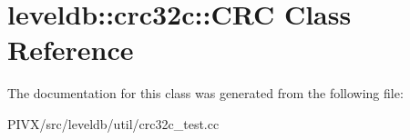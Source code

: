 \hypertarget{classleveldb_1_1crc32c_1_1_c_r_c}{}\section{leveldb\+:\+:crc32c\+:\+:C\+RC Class Reference}
\label{classleveldb_1_1crc32c_1_1_c_r_c}


The documentation for this class was generated from the following file\+:\begin{DoxyCompactItemize}
\item 
P\+I\+V\+X/src/leveldb/util/crc32c\+\_\+test.\+cc\end{DoxyCompactItemize}
